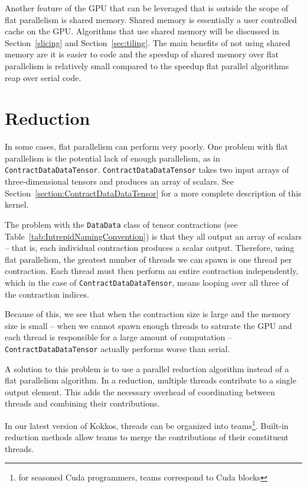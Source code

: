 Another feature of the GPU that can be leveraged that is outside the scope of
flat parallelism is shared memory. Shared memory is essentially a user controlled cache
on the GPU. Algorithms that use shared memory will be discussed in
Section~\ref{slicing} and Section~\ref{sec:tiling}. The main benefits of not
using shared memory are it is easier to code and the speedup of shared memory over flat parallelism 
is relatively small compared to the speedup flat parallel algorithms reap over
serial code. 

\section{Reduction} \label{sec:reduction} In some cases, flat parallelism can
perform very poorly.  One problem with flat parallelism is the potential lack
of enough parallelism, as in \texttt{ContractDataDataTensor}.
\texttt{ContractDataDataTensor} takes two input arrays of three-dimensional
tensors and produces an array of scalars.  See
Section~\ref{section:ContractDataDataTensor} for a more complete description of
this kernel.

The problem with the \texttt{DataData} class of tensor contractions (see
Table~\ref{tab:IntrepidNamingConvention}) is that they all output an array of
scalars -- that is, each individual contraction produces a scalar output.
Therefore, using flat parallelism, the greatest number of threads we can spawn
is one thread per contraction.  Each thread must then perform an entire
contraction independently, which in the case of
\texttt{ContractDataDataTensor}, means looping over all three of the
contraction indices.

Because of this, we see that when the contraction size is large and the memory
size is small -- when we cannot spawn enough threads to saturate the GPU and
each thread is responsible for a large amount of computation --
\texttt{ContractDataDataTensor} actually performs worse than serial.

A solution to this problem is to use a parallel reduction algorithm instead of
a flat parallelism algorithm.  In a reduction, multiple threads contribute to a
single output element.  This adds the necessary overhead of coordinating
between threads and combining their contributions.

In our latest version of Kokkos, threads can be organized into teams\footnote{for 
seasoned Cuda programmers, teams correspond to Cuda blocks}. 
Built-in reduction methods allow teams to merge the contributions of
their constituent threads.

